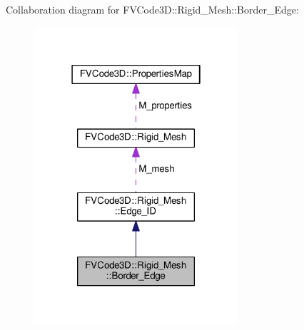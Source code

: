 Collaboration diagram for F\+V\+Code3D\+:\+:Rigid\+\_\+\+Mesh\+:\+:Border\+\_\+\+Edge\+:
\nopagebreak
\begin{figure}[H]
\begin{center}
\leavevmode
\includegraphics[width=214pt]{classFVCode3D_1_1Rigid__Mesh_1_1Border__Edge__coll__graph}
\end{center}
\end{figure}
